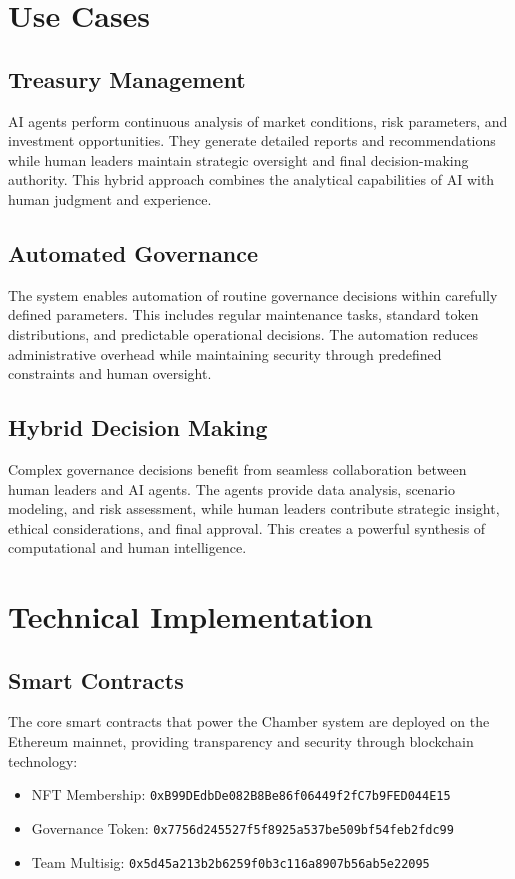 \documentclass[12pt]{article}
\begin{document}
\section{Use Cases}

\subsection{Treasury Management}
AI agents perform continuous analysis of market conditions, risk parameters, and investment opportunities. They generate detailed reports and recommendations while human leaders maintain strategic oversight and final decision-making authority. This hybrid approach combines the analytical capabilities of AI with human judgment and experience.

\subsection{Automated Governance}
The system enables automation of routine governance decisions within carefully defined parameters. This includes regular maintenance tasks, standard token distributions, and predictable operational decisions. The automation reduces administrative overhead while maintaining security through predefined constraints and human oversight.

\subsection{Hybrid Decision Making}
Complex governance decisions benefit from seamless collaboration between human leaders and AI agents. The agents provide data analysis, scenario modeling, and risk assessment, while human leaders contribute strategic insight, ethical considerations, and final approval. This creates a powerful synthesis of computational and human intelligence.

\section{Technical Implementation}

\subsection{Smart Contracts}
The core smart contracts that power the Chamber system are deployed on the Ethereum mainnet, providing transparency and security through blockchain technology:
\begin{itemize}
    \item NFT Membership: \texttt{0xB99DEdbDe082B8Be86f06449f2fC7b9FED044E15}
    \item Governance Token: \texttt{0x7756d245527f5f8925a537be509bf54feb2fdc99}
    \item Team Multisig: \texttt{0x5d45a213b2b6259f0b3c116a8907b56ab5e22095}
\end{itemize}
\end{document}
